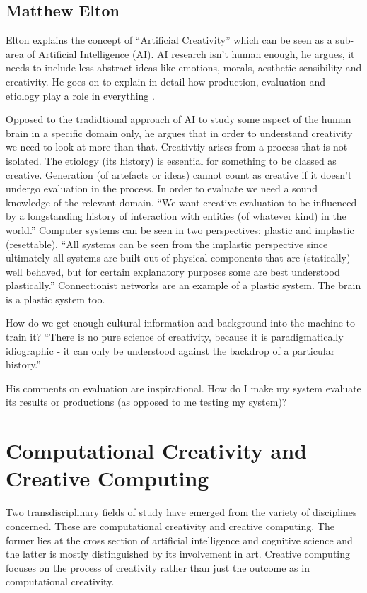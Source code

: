 \subsection{Matthew Elton}

Elton explains the concept of ``Artificial Creativity'' which can be seen as a sub-area of Artificial Intelligence (AI). AI research isn't human enough, he argues, it needs to include less abstract ideas like emotions, morals, aesthetic sensibility and creativity. He goes on to explain in detail how production, evaluation and etiology play a role in everything \citep{Elton1995}.

Opposed to the tradidtional approach of AI to study  some aspect of the human brain in a specific domain only, he argues that in order to understand creativity we need to look at more than that. Creativtiy arises from a process that is not isolated. The etiology (its history) is essential for something to be classed as creative. Generation (of artefacts or ideas) cannot count as creative if it doesn't undergo evaluation in the process. In order to evaluate we need a sound knowledge of the relevant domain. ``We want creative evaluation to be influenced by a longstanding history of interaction with entities (of whatever kind) in the world.'' Computer systems can be seen in two perspectives: plastic and implastic (resettable). ``All systems can be seen from the implastic perspective since ultimately all systems are built out of physical components that are (statically) well behaved, but for certain explanatory purposes some are best understood plastically.'' Connectionist networks are an example of a plastic system. The brain is a plastic system too.

How do we get enough cultural information and background into the machine to train it? ``There is no pure science of creativity, because it is paradigmatically idiographic - it can only be understood against the backdrop of a particular history.''

His comments on evaluation are inspirational. How do I make my system evaluate its results or productions (as opposed to me testing my system)?

\section{Computational Creativity and Creative Computing}

Two transdisciplinary fields of study have emerged from the variety of disciplines concerned. These are computational creativity and creative computing. The former lies at the cross section of artificial intelligence and cognitive science and the latter is mostly distinguished by its involvement in art. Creative computing focuses on the process of creativity rather than just the outcome as in computational creativity.

